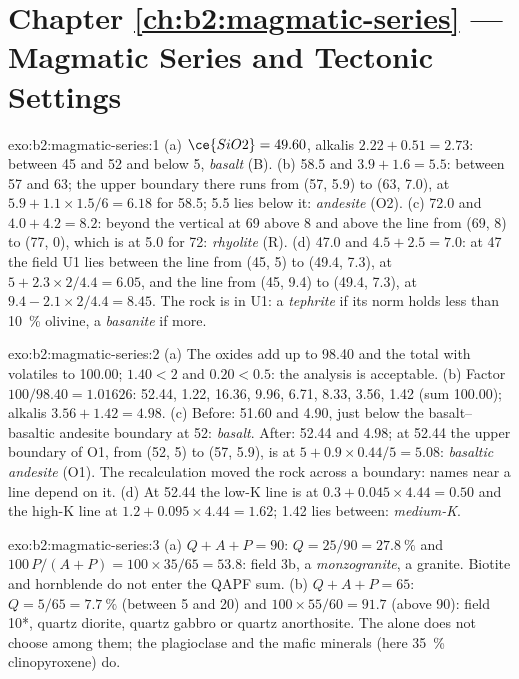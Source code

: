\section*{Chapter \ref{ch:b2:magmatic-series} --- Magmatic Series and Tectonic Settings}

\begin{solution}{exo:b2:magmatic-series:1}
(a) $\ce{SiO2} = 49.60$, alkalis $2.22 + 0.51 = 2.73$: between 45 and 52 and below 5,
\emph{basalt} (B). (b) 58.5 and $3.9 + 1.6 = 5.5$: between 57 and 63; the upper
boundary there runs from (57, 5.9) to (63, 7.0), at $5.9 + 1.1\times1.5/6 = 6.18$
for 58.5; 5.5 lies below it: \emph{andesite} (O2). (c) 72.0 and $4.0 + 4.2 = 8.2$:
beyond the vertical at 69 above 8 and above the line from (69, 8) to (77, 0), which is
at 5.0 for 72: \emph{rhyolite} (R). (d) 47.0 and $4.5 + 2.5 = 7.0$: at 47 the field U1
lies between the line from (45, 5) to (49.4, 7.3), at $5 + 2.3\times2/4.4 = 6.05$, and
the line from (45, 9.4) to (49.4, 7.3), at $9.4 - 2.1\times2/4.4 = 8.45$. The rock is
in U1: a \emph{tephrite} if its norm holds less than \qty{10}{\percent} olivine, a
\emph{basanite} if more.
\end{solution}

\begin{solution}{exo:b2:magmatic-series:2}
(a) The oxides add up to 98.40 and the total with volatiles to 100.00;
 $1.40 < 2$ and  $0.20 < 0.5$: the analysis is acceptable. (b) Factor
$100/98.40 = 1.01626$:  52.44,  1.22,  16.36,
 9.96,  6.71,  8.33,  3.56,  1.42
(sum 100.00); alkalis $3.56 + 1.42 = 4.98$. (c) Before: 51.60 and 4.90, just below the
basalt--basaltic andesite boundary at 52: \emph{basalt}. After: 52.44 and 4.98; at
52.44 the upper boundary of O1, from (52, 5) to (57, 5.9), is at $5 + 0.9\times0.44/5
= 5.08$: \emph{basaltic andesite} (O1). The recalculation moved the rock across a
boundary: names near a line depend on it. (d) At 52.44 the low-K line is at $0.3 +
0.045\times4.44 = 0.50$ and the high-K line at $1.2 + 0.095\times4.44 = 1.62$; 1.42
lies between: \emph{medium-K}.
\end{solution}

\begin{solution}{exo:b2:magmatic-series:3}
(a) $Q + A + P = 90$: $Q = 25/90 = \qty{27.8}{\percent}$ and $100\,P/(A + P) =
100\times35/65 = 53.8$: field 3b, a \emph{monzogranite}, a granite. Biotite and
hornblende do not enter the QAPF sum. (b) $Q + A + P = 65$: $Q = 5/65 =
\qty{7.7}{\percent}$ (between 5 and 20) and $100\times55/60 = 91.7$ (above 90): field
10*, quartz diorite, quartz gabbro or quartz anorthosite. The  alone does
not choose among them; the plagioclase and the mafic minerals (here
\qty{35}{\percent} clinopyroxene) do.
\end{solution}

